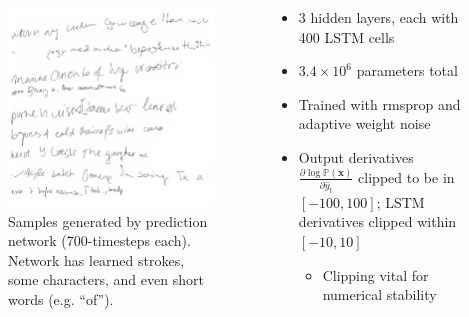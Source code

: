 \documentclass[10pt,xcolor=dvipsnames]{beamer}
\begin{document}
\begin{frame}
\begin{columns}
  \begin{column}{.5\textwidth}
  \begin{figure}
    \centering
    \includegraphics[width=\linewidth]{fig/fig11.png}
    \caption{Samples generated by prediction network (700-timesteps each).
      Network has learned strokes, some characters, and even short words (e.g. ``of'').}
    \label{fig:fig11}
  \end{figure}
  \end{column}

  \begin{column}{.5\textwidth}
    \begin{itemize}
    \item 3 hidden layers, each with 400 LSTM cells
    \item $3.4 \times 10^6$ parameters total
    \item Trained with rmsprop and adaptive weight noise
    \item Output derivatives $\frac{\partial \log
        \mathbb{P}(\mathbf{x})}{\partial \hat{y}_t}$ clipped to be in $[-100,
      100]$; LSTM derivatives clipped within $[-10, 10]$
      \begin{itemize}
      \item Clipping vital for numerical stability
      \end{itemize}
    \end{itemize}
  \end{column}
\end{columns}
\end{frame}
\end{document}
